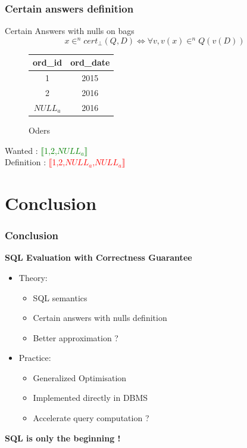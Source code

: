 \documentclass{beamer}
\begin{document}
		\begin{frame}
			\frametitle{Certain answers definition}
			 \begin{block}{Certain Answers with nulls on bags}
			 	$$ x\in^n cert_\bot(Q,D) \iff \forall v, v(x) \in^n Q(v(D))$$
			 \end{block}
			 \begin{figure}
			 	\caption{Oders}
			 	\begin{tabular}{cc}
			 		\hline
			 		ord\_id & ord\_date \\
			 		\hline
			 		1 &  2015 \\
			 		2 &  2016 \\
			 		$NULL_a$ &  2016 \\
			 		\hline
			 	\end{tabular}
			 \end{figure}
			 \bigskip
			 \pause
		Wanted : \textcolor{green}{$\llbracket$1,2,$NULL_a$$\rrbracket$} \\
		\pause
		Definition : \textcolor{red}{$\llbracket$1,2,$NULL_a$,$NULL_a$$\rrbracket$}
		\end{frame}
		
		\section{Conclusion}
		
		\begin{frame}
			\frametitle{Conclusion}
			\textbf{SQL Evaluation with Correctness Guarantee}
			\begin{itemize}
				\item<1-> Theory:
					\begin{itemize}
						\item SQL semantics
						\item Certain answers with nulls definition
						\item Better approximation ?
					\end{itemize}
				\item<2-> Practice:
					\begin{itemize}
						\item Generalized Optimisation
						\item Implemented directly in DBMS
						\item Accelerate query computation ?
					\end{itemize}
			\end{itemize}
			\bigskip
			\pause
			\pause
			\textbf{SQL is only the beginning !}
		\end{frame}
\end{document}
